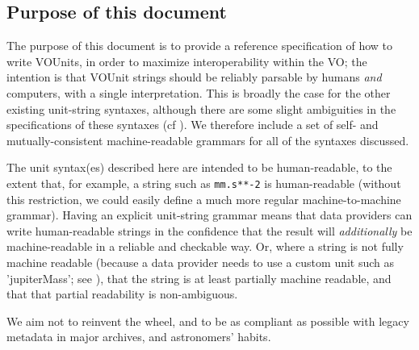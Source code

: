 \documentclass[11pt,a4paper]{ivoa}
\newcommand{\unit}[1]{\texttt{\small\color{orange}#1}}
\begin{document}


\subsection{Purpose of this document}
\label{sec:purpose}

The purpose of this document is to provide a reference specification of how
to write VOUnits, in order to maximize interoperability within the VO;
the intention is that VOUnit strings should be reliably
parsable by humans \emph{and} computers, with a single interpretation.
This is broadly the case for the other existing
unit-string syntaxes, although there are some slight ambiguities in
the specifications of these syntaxes (cf ).
We therefore include a set of self- and mutually-consistent
machine-readable grammars for all of the syntaxes discussed.

The unit syntax(es) described here are intended to be human-readable,
to the extent that, for example, a string such as \unit{mm.s**-2} is
human-readable (without this restriction, we could easily define a
much more regular machine-to-machine grammar).  Having an explicit
unit-string grammar means that data providers can write human-readable
strings in the confidence that the result will \emph{additionally} be
machine-readable in a reliable and checkable way.  Or, where a string
is not fully machine readable (because a data provider needs to use a
custom unit such as 'jupiterMass'; see ), that the
string is at least partially machine readable, and that that partial
readability is non-ambiguous.

We aim not to reinvent the wheel, and to be as compliant as possible with
legacy metadata in major archives, and astronomers' habits.
\end{document}
